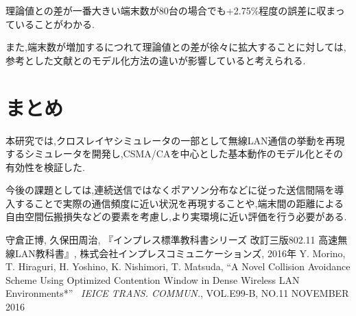 \documentclass[a4paper, 10pt]{ltjsarticle}
\begin{document}
理論値との差が一番大きい端末数が80台の場合でも+2.75\%程度の誤差に収まっていることがわかる.

また,端末数が増加するにつれて理論値との差が徐々に拡大することに対しては,参考とした文献\cite{paper}とのモデル化方法の違いが影響していると考えられる.

\section{まとめ}
本研究では,クロスレイヤシミュレータの一部として無線LAN通信の挙動を再現するシミュレータを開発し,CSMA/CAを中心とした基本動作のモデル化とその有効性を検証した.

今後の課題としては,連続送信ではなくポアソン分布などに従った送信間隔を導入することで実際の通信頻度に近い状況を再現することや,端末間の距離による自由空間伝搬損失などの要素を考慮し,より実環境に近い評価を行う必要がある.




\begin{thebibliography}{9}
  守倉正博, 久保田周治, 『インプレス標準教科書シリーズ 改訂三版802.11 高速無線LAN教科書』, 株式会社インプレスコミュニケーションズ, 2016年
  Y. Morino, T. Hiraguri, H. Yoshino, K. Nishimori, T. Matsuda, ``A Novel Collision Avoidance Scheme Using Optimized Contention Window in Dense Wireless LAN Environments*'' \, \textit{IEICE TRANS. COMMUN.}, VOL.E99-B, NO.11 NOVEMBER 2016
\end{thebibliography}
\end{document}
